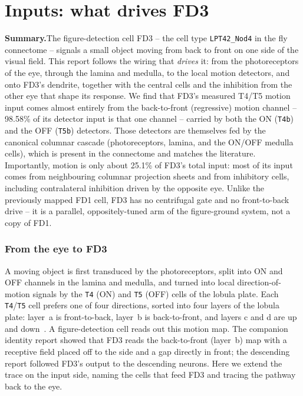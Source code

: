 \documentclass[11pt]{article}
\newcommand{\ttt}[1]{\texttt{#1}}
\begin{document}
\clearpage\part{Inputs: what drives FD3}

\textbf{Summary.}\quad The figure-detection cell FD3 -- the cell type \ttt{LPT42\_Nod4} in the fly connectome -- signals a small object moving from back to front on one side of the visual field. This report follows the wiring that \emph{drives} it: from the photoreceptors of the eye, through the lamina and medulla, to the local motion detectors, and onto FD3's dendrite, together with the central cells and the inhibition from the other eye that shape its response. We find that FD3's measured T4/T5 motion input comes almost entirely from the back-to-front (regressive) motion channel -- 98.58\% of its detector input is that one channel -- carried by both the ON (\ttt{T4b}) and the OFF (\ttt{T5b}) detectors. Those detectors are themselves fed by the canonical columnar cascade (photoreceptors, lamina, and the ON/OFF medulla cells), which is present in the connectome and matches the literature. Importantly, motion is only about 25.1\% of FD3's total input: most of its input comes from neighbouring columnar projection sheets and from inhibitory cells, including contralateral inhibition driven by the opposite eye. Unlike the previously mapped FD1 cell, FD3 has no centrifugal gate and no front-to-back drive -- it is a parallel, oppositely-tuned arm of the figure-ground system, not a copy of FD1.

\section{From the eye to FD3}

A moving object is first transduced by the photoreceptors, split into ON and OFF channels in the lamina and medulla, and turned into local direction-of-motion signals by the \ttt{T4} (ON) and \ttt{T5} (OFF) cells of the lobula plate. Each \ttt{T4}/\ttt{T5} cell prefers one of four directions, sorted into four layers of the lobula plate: layer~a is front-to-back, layer~b is back-to-front, and layers c and d are up and down~\cite{maisak2013}. A figure-detection cell reads out this motion map. The companion identity report showed that FD3 reads the back-to-front (layer~b) map with a receptive field placed off to the side and a gap directly in front; the descending report followed FD3's output to the descending neurons. Here we extend the trace on the input side, naming the cells that feed FD3 and tracing the pathway back to the eye.
\end{document}
